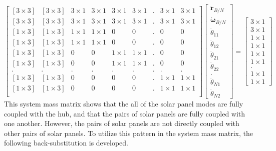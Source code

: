 \begin{equation}
	\begin{bmatrix}
		[3\times 3] & [3\times 3] & 3\times 1 & 3\times 1 & 3\times 1 & 3\times 1 & . & 3\times 1 & 3\times 1\\
		[3\times 3] & [3\times 3] & 3\times 1 & 3\times 1 & 3\times 1 & 3\times 1 & . & 3\times 1 & 3\times 1\\
		[1\times 3] & [1\times 3] & 1\times 1 & 1\times 1  & 0 & 0 & . & 0 & 0\\
		[1\times 3] & [1\times 3] & 1\times 1 & 1\times 1  & 0 & 0 & . & 0 & 0\\
		[1\times 3] & [1\times 3] & 0 & 0  & 1\times 1 & 1\times 1 & . & 0 & 0 \\
		[1\times 3] & [1\times 3] & 0 & 0  & 1\times 1 & 1\times 1 & . & 0 & 0\\
		. & . & . & . & . & . & . & . & .\\
		[1\times 3] & [1\times 3] & 0 & 0  & 0 & 0 & . & 1\times 1 & 1\times 1\\
		[1\times 3] & [1\times 3] & 0 & 0  & 0 & 0 & . & 1\times 1 & 1\times 1\\
	\end{bmatrix}
	\begin{bmatrix}
		\ddot{\boldsymbol{r}}_{B/N}\\
		\dot{\boldsymbol{\omega}}_{B/N}\\
		\ddot{\theta}_{11}\\
		\ddot{\theta}_{12}\\
		\ddot{\theta}_{21}\\
		\ddot{\theta}_{22}\\
		.\\
		\ddot{\theta}_{N1}\\
		\ddot{\theta}_{N2}
	\end{bmatrix}
	=
	\begin{bmatrix}
		3\times 1\\
		3\times 1\\
		1\times 1\\
		1\times 1\\
		1\times 1\\
		1\times 1\\
		.\\
		1\times 1\\
		1\times 1
	\end{bmatrix}
\end{equation}
This system mass matrix shows that the all of the solar panel modes are fully coupled with the hub, and that the pairs of solar panels are fully coupled with one another. However, the pairs of solar panels are not directly coupled with other pairs of solar panels. To utilize this pattern in the system mass matrix, the following back-substitution is developed.

